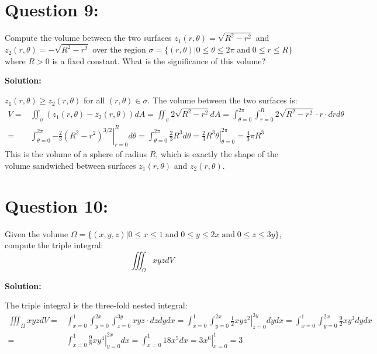 \documentclass{article}
\newcommand{\at}[1]{\left. #1 \right|}
\newcommand{\dr}[1]{\textcolor{dark_red}{#1}}
\begin{document}
\section*{Question 9:}

Compute the volume between the two surfaces \(z_1(r,\theta) = \sqrt{R^2 - r^2}\) and \(z_2(r,\theta) = -\sqrt{R^2 - r^2}\) over the region \(\sigma = \{(r,\theta)|0 \leq \theta \leq 2\pi \;\text{and}\; 0 \leq r \leq R\}\) where \(R > 0\) is a fixed constant. What is the significance of this volume?

\vspace{5mm}
\dr{\textbf{Solution:}}

\dr{
\(z_1(r,\theta) \geq z_2(r,\theta)\) for all \((r,\theta) \in \sigma\). The volume between the two surfaces is:
\begin{align*}
V = & \iint_{\sigma} (z_1(r,\theta) - z_2(r,\theta))dA 
= \iint_{\sigma} 2\sqrt{R^2 - r^2}dA 
= \int_{\theta = 0}^{2\pi} \int_{r = 0}^R 2\sqrt{R^2 - r^2} \cdot r \cdot drd\theta \\
= & \int_{\theta = 0}^{2\pi} \at{-\frac{2}{3}(R^2 - r^2)^{3/2}}_{r = 0}^Rd\theta 
= \int_{\theta = 0}^{2\pi} \frac{2}{3}R^3 d\theta 
= \at{\frac{2}{3}R^3\theta}_{\theta = 0}^{2\pi} 
=\frac{4}{3}\pi R^3 
\end{align*}
This is the volume of a sphere of radius \(R\), which is exactly the shape of the volume sandwiched between surfaces \(z_1(r,\theta)\) and \(z_2(r,\theta)\).
}




\section*{Question 10:}

Given the volume \(\Omega = \{(x,y,z)|0 \leq x \leq 1 \;\text{and}\; 0 \leq y \leq 2x \;\text{and}\; 0 \leq z \leq 3y\}\), compute the triple integral: 
\[\iiint_{\Omega} xyz dV\]

\vspace{5mm}
\dr{\textbf{Solution:}}

\dr{
The triple integral is the three-fold nested integral:
\begin{align*}
\iiint_{\Omega} xyz dV = & \int_{x = 0}^1 \int_{y = 0}^{2x} \int_{z = 0}^{3y} xyz \cdot dzdydx 
= \int_{x = 0}^1 \int_{y = 0}^{2x} \at{\frac{1}{2}xyz^2}_{z = 0}^{3y} dydx 
= \int_{x = 0}^1 \int_{y = 0}^{2x} \frac{9}{2}xy^3 dydx \\
= & \int_{x = 0}^1 \at{\frac{9}{8}xy^4}_{y = 0}^{2x} dx 
= \int_{x = 0}^1 18x^5 dx 
= \at{3x^6}_{x = 0}^1 
= 3
\end{align*}
}
\end{document}

